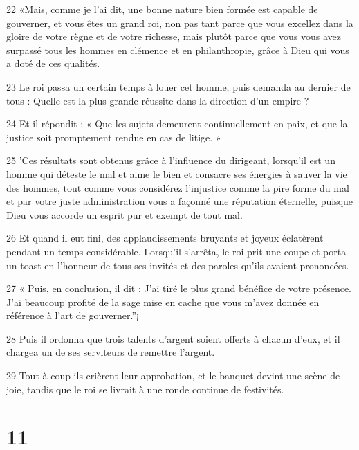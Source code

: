 \par 22 «Mais, comme je l'ai dit, une bonne nature bien formée est capable de gouverner, et vous êtes un grand roi, non pas tant parce que vous excellez dans la gloire de votre règne et de votre richesse, mais plutôt parce que vous vous avez surpassé tous les hommes en clémence et en philanthropie, grâce à Dieu qui vous a doté de ces qualités.

\par 23 Le roi passa un certain temps à louer cet homme, puis demanda au dernier de tous : Quelle est la plus grande réussite dans la direction d'un empire ?

\par 24 Et il répondit : « Que les sujets demeurent continuellement en paix, et que la justice soit promptement rendue en cas de litige. »

\par 25 'Ces résultats sont obtenus grâce à l'influence du dirigeant, lorsqu'il est un homme qui déteste le mal et aime le bien et consacre ses énergies à sauver la vie des hommes, tout comme vous considérez l'injustice comme la pire forme du mal et par votre juste administration vous a façonné une réputation éternelle, puisque Dieu vous accorde un esprit pur et exempt de tout mal.

\par 26 Et quand il eut fini, des applaudissements bruyants et joyeux éclatèrent pendant un temps considérable. Lorsqu'il s'arrêta, le roi prit une coupe et porta un toast en l'honneur de tous ses invités et des paroles qu'ils avaient prononcées.

\par 27 « Puis, en conclusion, il dit : J'ai tiré le plus grand bénéfice de votre présence. J'ai beaucoup profité de la sage mise en cache que vous m'avez donnée en référence à l'art de gouverner.''¡

\par 28 Puis il ordonna que trois talents d'argent soient offerts à chacun d'eux, et il chargea un de ses serviteurs de remettre l'argent.

\par 29 Tout à coup ils crièrent leur approbation, et le banquet devint une scène de joie, tandis que le roi se livrait à une ronde continue de festivités.

\chapter{11}

